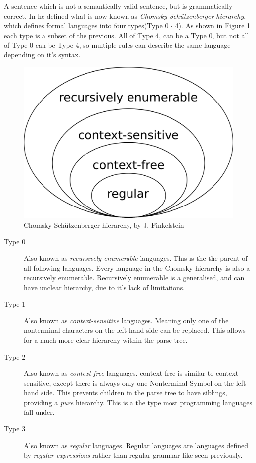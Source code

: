 A sentence which is not a semantically valid sentence, but is grammatically correct. In \autocite{Chomsky} he defined what is now known as \textit{Chomsky-Schützenberger hierarchy}, which defines formal languages into four types(Type 0 - 4). As shown in Figure \ref{fig:Chomsky} each type is a subset of the previous. All of Type 4, can be a Type 0, but not all of Type 0 can be Type 4, so multiple rules can describe the same language depending on it's syntax.
\clearpage
\begin{figure}[h]
    \centerline{\includegraphics[width=0.5\linewidth]{img/Chomsky.png}}
    \caption{Chomsky-Schützenberger hierarchy, by J. Finkelstein}
    \label{fig:Chomsky}
\end{figure}
\begin{description}
    \item[Type 0] Also known as \textit{recursively enumerable} languages. This is the the parent of all following languages. Every language in the Chomsky hierarchy is also a recursively enumerable. Recursively enumerable is a generalised, and can have unclear hierarchy, due to it's lack of limitations.
    \item[Type 1] Also known as \textit{context-sensitive} languages. Meaning only one of the nonterminal characters on the left hand side can be replaced. This allows for a much more clear hierarchy within the parse tree.
    \item[Type 2] Also known as \textit{context-free} languages. context-free is similar to context sensitive, except there is always only one Nonterminal Symbol on the left hand side. This prevents children in the parse tree to have siblings, providing a \textit{pure} hierarchy. This is a the type most programming languages fall under.
    \item[Type 3]  Also known as \textit{regular} languages. Regular languages are languages defined by \textit{regular expressions} rather than regular grammar like seen previously.
\end{description}

